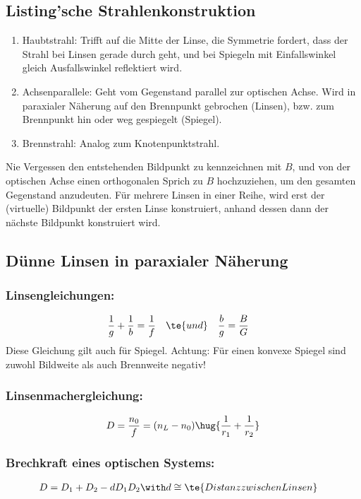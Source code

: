 \documentclass[twocolumn, unnumberedsubsub]{summery_3.1}
\begin{document}
\subsection{Listing'sche Strahlenkonstruktion}
\begin{enumerate}
    \item Haubtstrahl: Trifft auf die Mitte der Linse, die Symmetrie fordert, dass 
    der Strahl bei Linsen gerade durch geht, und bei Spiegeln mit Einfallswinkel gleich Ausfallswinkel
    reflektiert wird. 
    \item Achsenparallele: Geht vom Gegenstand parallel zur optischen Achse. Wird in paraxialer Näherung 
    auf den Brennpunkt gebrochen (Linsen), bzw. zum Brennpunkt hin oder weg gespiegelt (Spiegel).
    \item Brennstrahl: Analog zum Knotenpunktstrahl.
\end{enumerate}
Nie Vergessen den entstehenden Bildpunkt zu kennzeichnen mit \(B\), und von der optischen Achse einen 
orthogonalen Sprich zu \(B\) hochzuziehen, um den gesamten Gegenstand anzudeuten. 
Für mehrere Linsen in einer Reihe, wird erst der (virtuelle) Bildpunkt der ersten Linse konstruiert,
anhand dessen dann der nächste Bildpunkt konstruiert wird.

\subsection{Dünne Linsen in paraxialer Näherung}

\subsubsection*{Linsengleichungen:}\tight
\begin{align*}
    \frac 1g + \frac 1b &= \frac 1f&&\te{und}&
    \frac{b}{g} &= \frac BG   
\end{align*}
Diese Gleichung gilt auch für Spiegel. Achtung: Für einen konvexe Spiegel 
sind zuwohl Bildweite als auch Brennweite negativ!\tight


\subsubsection*{Linsenmachergleichung:}\tight
\begin{align*}
    D = \frac {n_0}f = (n_L - n_0)\hug{\frac 1{r_1} + \frac 1{r_2}}
\end{align*}\ttight

\subsubsection*{Brechkraft eines optischen Systems:}\tight
\begin{align*}
    D &= D_1 + D_2 - d D_1 D_2\with d\cong \te{Distanz zwischen Linsen}
\end{align*}
\end{document}
